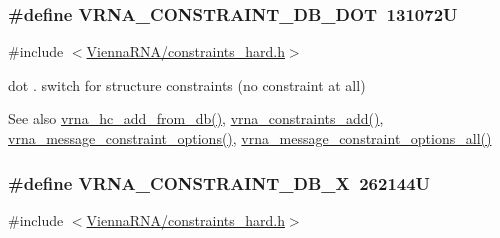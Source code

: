 \subsubsection[{\texorpdfstring{V\+R\+N\+A\+\_\+\+C\+O\+N\+S\+T\+R\+A\+I\+N\+T\+\_\+\+D\+B\+\_\+\+D\+OT}{VRNA_CONSTRAINT_DB_DOT}}]{\setlength{\rightskip}{0pt plus 5cm}\#define V\+R\+N\+A\+\_\+\+C\+O\+N\+S\+T\+R\+A\+I\+N\+T\+\_\+\+D\+B\+\_\+\+D\+OT~131072U}\hypertarget{group__hard__constraints_ga369bea82eae75fbe626f409fa425747e}{}\label{group__hard__constraints_ga369bea82eae75fbe626f409fa425747e}


{\ttfamily \#include $<$\hyperlink{constraints__hard_8h}{Vienna\+R\+N\+A/constraints\+\_\+hard.\+h}$>$}



dot \textquotesingle{}.\textquotesingle{} switch for structure constraints (no constraint at all) 

\begin{DoxySeeAlso}{See also}
\hyperlink{group__hard__constraints_ga5b4de3247b67358080c176b94591a8e6}{vrna\+\_\+hc\+\_\+add\+\_\+from\+\_\+db()}, \hyperlink{group__constraints_ga35a401f680969a556858a8dd5f1d07cc}{vrna\+\_\+constraints\+\_\+add()}, \hyperlink{group__constraints_gaa1f20b53bf09ac2e6b0dbb13f7d89670}{vrna\+\_\+message\+\_\+constraint\+\_\+options()}, \hyperlink{group__constraints_gaec7e13fa0465c2acc7a621d1aecb709f}{vrna\+\_\+message\+\_\+constraint\+\_\+options\+\_\+all()} 
\end{DoxySeeAlso}
\subsubsection[{\texorpdfstring{V\+R\+N\+A\+\_\+\+C\+O\+N\+S\+T\+R\+A\+I\+N\+T\+\_\+\+D\+B\+\_\+X}{VRNA_CONSTRAINT_DB_X}}]{\setlength{\rightskip}{0pt plus 5cm}\#define V\+R\+N\+A\+\_\+\+C\+O\+N\+S\+T\+R\+A\+I\+N\+T\+\_\+\+D\+B\+\_\+X~262144U}\hypertarget{group__hard__constraints_ga7283bbe0f8954f7b030ecc3f2d1932b2}{}\label{group__hard__constraints_ga7283bbe0f8954f7b030ecc3f2d1932b2}


{\ttfamily \#include $<$\hyperlink{constraints__hard_8h}{Vienna\+R\+N\+A/constraints\+\_\+hard.\+h}$>$}



